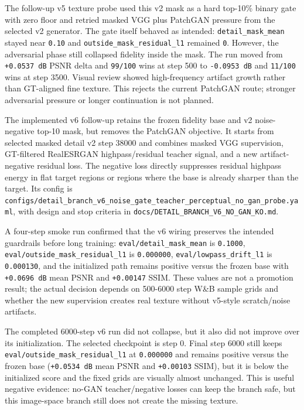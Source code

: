 \documentclass[
  10pt,
]{article}
\begin{document}
The follow-up v5 texture probe used this v2 mask as a hard top-10\%
binary gate with zero floor and retried masked VGG plus PatchGAN
pressure from the selected v2 generator. The gate itself behaved as
intended: \texttt{detail\_mask\_mean} stayed near \texttt{0.10} and
\texttt{outside\_mask\_residual\_l1} remained \texttt{0}. However, the
adversarial phase still collapsed fidelity inside the mask. The run
moved from \texttt{+0.0537\ dB} PSNR delta and \texttt{99/100} wins at
step 500 to \texttt{-0.0953\ dB} and \texttt{11/100} wins at step 3500.
Visual review showed high-frequency artifact growth rather than
GT-aligned fine texture. This rejects the current PatchGAN route;
stronger adversarial pressure or longer continuation is not planned.

The implemented v6 follow-up retains the frozen fidelity base and v2
noise-negative top-10 mask, but removes the PatchGAN objective. It
starts from selected masked detail v2 step 38000 and combines masked VGG
supervision, GT-filtered RealESRGAN highpass/residual teacher signal,
and a new artifact-negative residual loss. The negative loss directly
suppresses residual highpass energy in flat target regions or regions
where the base is already sharper than the target. Its config is
\texttt{configs/detail\_branch\_v6\_noise\_gate\_teacher\_perceptual\_no\_gan\_probe.yaml},
with design and stop criteria in
\texttt{docs/DETAIL\_BRANCH\_V6\_NO\_GAN\_KO.md}.

A four-step smoke run confirmed that the v6 wiring preserves the
intended guardrails before long training:
\texttt{eval/detail\_mask\_mean} is \texttt{0.1000},
\texttt{eval/outside\_mask\_residual\_l1} is \texttt{0.000000},
\texttt{eval/lowpass\_drift\_l1} is \texttt{0.000130}, and the
initialized path remains positive versus the frozen base with
\texttt{+0.0696\ dB} mean PSNR and \texttt{+0.00147} SSIM. These values
are not a promotion result; the actual decision depends on 500-6000 step
W\&B sample grids and whether the new supervision creates real texture
without v5-style scratch/noise artifacts.

The completed 6000-step v6 run did not collapse, but it also did not
improve over its initialization. The selected checkpoint is step 0.
Final step 6000 still keeps \texttt{eval/outside\_mask\_residual\_l1} at
\texttt{0.000000} and remains positive versus the frozen base
(\texttt{+0.0534\ dB} mean PSNR and \texttt{+0.00103} SSIM), but it is
below the initialized score and the fixed grids are visually almost
unchanged. This is useful negative evidence: no-GAN teacher/negative
losses can keep the branch safe, but this image-space branch still does
not create the missing texture.
\end{document}
